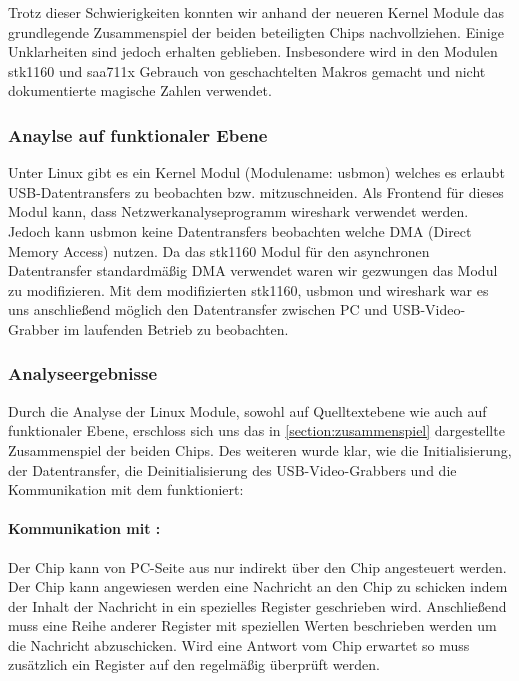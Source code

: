 Trotz dieser Schwierigkeiten konnten wir anhand der neueren Kernel Module das grundlegende Zusammenspiel der beiden beteiligten Chips nachvollziehen. Einige Unklarheiten sind jedoch erhalten geblieben. Insbesondere wird in den Modulen stk1160 und saa711x Gebrauch von geschachtelten Makros gemacht und nicht dokumentierte magische Zahlen verwendet. 

\subsubsection{Anaylse auf funktionaler Ebene}
Unter Linux gibt es ein Kernel Modul (Modulename: usbmon) welches es erlaubt USB-Datentransfers zu beobachten bzw. 
mitzuschneiden. Als Frontend für dieses Modul kann, dass Netzwerkanalyseprogramm wireshark \autocite{website:wireshark} verwendet werden. 
Jedoch kann usbmon keine Datentransfers beobachten welche DMA (Direct Memory Access) nutzen. Da das stk1160 Modul für den 
asynchronen Datentransfer standardmäßig DMA verwendet waren wir gezwungen das Modul zu modifizieren.
Mit dem modifizierten stk1160, usbmon und wireshark war es uns anschließend möglich den Datentransfer zwischen PC
und USB-Video-Grabber im laufenden Betrieb zu beobachten. 

\subsubsection{Analyseergebnisse}
Durch die Analyse der Linux Module, sowohl auf Quelltextebene wie auch auf funktionaler Ebene, erschloss sich uns das in \autoref{section:zusammenspiel} dargestellte Zusammenspiel der beiden Chips. Des weiteren wurde klar, wie die Initialisierung, der Datentransfer, die Deinitialisierung des
USB-Video-Grabbers und die Kommunikation mit dem \saa{} funktioniert:

\paragraph{Kommunikation mit \saa{}:} Der \saa{} Chip kann von PC-Seite aus nur indirekt über den \stk{} Chip angesteuert werden.
Der \stk{} Chip kann angewiesen werden eine \iic{} Nachricht an den \saa{} Chip zu schicken indem der Inhalt der Nachricht in ein
spezielles Register geschrieben wird. Anschließend muss eine Reihe anderer Register mit speziellen Werten beschrieben werden um
die Nachricht abzuschicken. Wird eine Antwort vom \saa{} Chip erwartet so muss zusätzlich ein Register auf den \stk{} regelmäßig überprüft werden.

